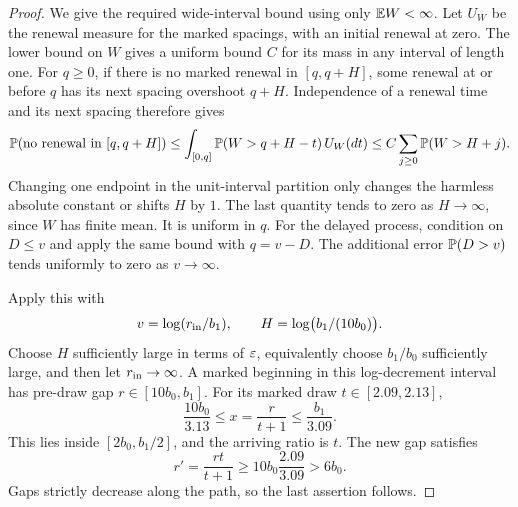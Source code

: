 \begin{proof}
We give the required wide-interval bound using only
\(\mathbb E W<\infty\).
Let \(U_W\) be the renewal measure for the marked spacings,
with an initial renewal at zero.
The lower bound on \(W\) gives a uniform bound \(C\) for its
mass in any interval of length one.
For \(q\ge0\), if there is no marked renewal in \([q,q+H]\),
some renewal at or before \(q\) has its next spacing overshoot
\(q+H\).  Independence of a renewal time and its next spacing
therefore gives
\[
 \mathbb P(\text{no renewal in }[q,q+H])
 \le\int_{[0,q]}\mathbb P(W>q+H-t)\,U_W(dt)
 \le C\sum_{j\ge0}\mathbb P(W>H+j).
\]
Changing one endpoint in the unit-interval partition only changes
the harmless absolute constant or shifts \(H\) by \(1\).
The last quantity tends to zero as \(H\to\infty\), since \(W\)
has finite mean.  It is uniform in \(q\).
For the delayed process, condition on \(D\le v\) and apply the
same bound with \(q=v-D\).  The additional error
\(\mathbb P(D>v)\) tends uniformly to zero as \(v\to\infty\).

Apply this with
\[
 v=\log(r_{\rm in}/b_1),\qquad
 H=\log\bigl(b_1/(10b_0)\bigr).
\]
Choose \(H\) sufficiently large in terms of \(\varepsilon\), equivalently
choose \(b_1/b_0\) sufficiently large, and then let
\(r_{\rm in}\to\infty\).
A marked beginning in this log-decrement interval has pre-draw
gap \(r\in[10b_0,b_1]\).
For its marked draw \(t\in[2.09,2.13]\),
\[
 \frac{10b_0}{3.13}\le x=\frac r{t+1}
 \le\frac{b_1}{3.09}.
\]
This lies inside \([2b_0,b_1/2]\), and the arriving ratio is \(t\).
The new gap satisfies
\[
 r'=\frac{rt}{t+1}\ge
 10b_0\frac{2.09}{3.09}>6b_0.
\]
Gaps strictly decrease along the path, so the last assertion
follows.
\end{proof}
